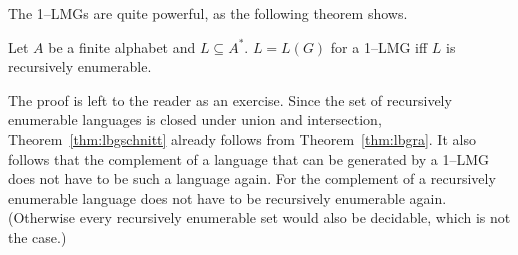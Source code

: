 The 1--LMGs are quite powerful, as the following theorem shows.
\begin{thm}
\label{thm:lbgra}
Let $A$ be a finite alphabet and $L \subseteq A^{\ast}$.
$L = L(G)$ for a 1--LMG iff $L$ is recursively
enumerable.
\end{thm}
The proof is left to the reader as an exercise. Since the set of
recursively enumerable languages is closed under union and
intersection, Theorem~\ref{thm:lbgschnitt} already follows from
Theorem~\ref{thm:lbgra}. It also follows that the complement
of a language that can be generated by a 1--LMG does not have
to be such a language again. For the complement of a recursively
enumerable language does not have to be recursively enumerable
again. (Otherwise every recursively enumerable set would also
be decidable, which is not the case.)

